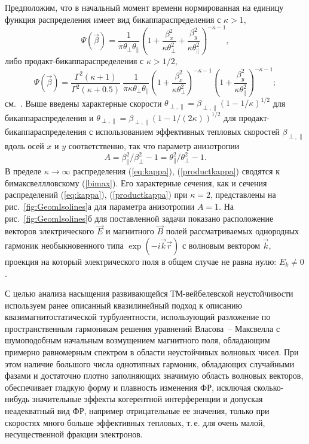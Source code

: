 Предположим, что в начальный момент времени нормированная на единицу функция распределения имеет вид бикаппа{\PunctumKappa}распределения с $\kappa >  1$, 
\begin{equation}
\label{eq:kappa}
    \Psi(\vec{\beta})=\dfrac{1}{\pi\theta_{\perp}\theta_{\|} } \left(1+\dfrac{\beta_x^2}{\kappa\theta_{\perp}^2}+\dfrac{\beta_y^2}{\kappa\theta_{\|}^2}\right)^{-\kappa-1} ,
\end{equation}
либо продакт-бикаппа{\PunctumKappa}распределения с $\kappa > 1/2$, 
\begin{equation}
\label{productkappa}
\Psi(\vec{\beta}) = \dfrac{\Gamma^2(\kappa+1)}{\Gamma^2(\kappa+0.5)} \: \dfrac{1}{\pi\kappa\theta_{\perp}\theta_{\|}}\left(1+\dfrac{\beta_x^2}{\kappa\theta_{\perp}^2}\right)^{-\kappa-1} \!\left(1+\dfrac{\beta_y^2}{\kappa\theta_{\|}^2}\right)^{-\kappa-1};
\end{equation}
см.~\cite{Lazar2010, Livadiotis2017, Livadiotis2021,Pierrard2010}. 
Выше введены характерные скорости $\theta_{\perp,\|}=\beta_{\perp,\|}\left(1-1/\kappa\right)^{1/2}$ для бикаппа{\PunctumKappa}распределения и $\theta_{\perp,\|}=\beta_{\perp,\|}\left(1-1/(2\kappa)\right)^{1/2}$ для продакт-бикаппа{\PunctumKappa}распределения с использованием эффективных тепловых скоростей $\beta_{\perp,\|}$ вдоль осей $x$ и $y$ соответственно, так что параметр анизотропии
\begin{equation}
A={\beta^2_{\|}}/{\beta^2_{\perp}}-1={\theta^2_{\|}}/{\theta^2_{\perp}}-1.
\end{equation}
В пределе $\kappa \rightarrow \infty$ распределения (\ref{eq:kappa}), (\ref{productkappa}) сводятся к бимаксвеллловскому (\ref{bimax}).
Его характерные сечения, как и сечения распределений (\ref{eq:kappa}), (\ref{productkappa}) при $\kappa=2$, представлены на рис.~\ref{fig:GeomIsolines}а для параметра анизотропии $A=1$. 
На рис.~\ref{fig:GeomIsolines}б для поставленной задачи показано расположение векторов электрического $\vec{E}$ и магнитного $\vec{B}$ полей рассматриваемых однородных гармоник необыкновенного типа $\exp(-i\vec{k}\vec{r})$ с волновым вектором $\vec{k}$, проекция на который электрического поля в общем случае не равна нулю: $E_k\neq0$.

С целью анализа насыщения развивающейся ТМ-вейбелевской неустойчивости используем ранее описанный квазилинейный подход к описанию квазимагнитостатической турбулентности, использующий разложение по пространственным гармоникам решения уравнений Власова~-- Максвелла с шумоподобным начальным возмущением магнитного поля, обладающим примерно равномерным спектром в области неустойчивых волновых чисел. 
При этом наличие большого числа однотипных гармоник, обладающих случайными фазами и достаточно плотно заполняющих значимую область волновых векторов, обеспечивает гладкую форму и плавность изменения ФР, исключая сколько-нибудь значительные эффекты когерентной интерференции и допуская неадекватный вид ФР, например отрицательные ее значения, только при скоростях много больше эффективных тепловых, т.\,е. для очень малой, несущественной фракции электронов.


